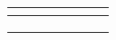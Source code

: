 \begin{table}[]
\begin{tabular}{l|l|l|l|l|l|l|}
\multicolumn{1}{|l|}{}                                                           &                                                                          &                                     &                                                                           &                                                                 &                                   &                                                                       \\ \hline
\multicolumn{1}{|l|}{}                                                           &                                                                          &                                     &                                                                           &                                                                 &                                   &                                                                       \\ \hline
\multicolumn{1}{|l|}{}                                                           &                                                                          &                                     &                                                                           &                                                                 &                                   &                                                                       \\ \hline
\multicolumn{1}{|l|}{}                                                           &                                                                          &                                     &                                                                           &                                                                 &                                   &                                                                       \\ \hline
\end{tabular}
\end{table}